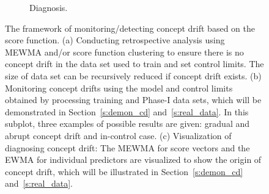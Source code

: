 \documentclass[twoside,11pt]{article}
\begin{document}
\begin{figure}[!htbp]
\begin{subfigure}[t]{0.49\linewidth}
         \caption{Diagnosis.}
         \label{fig:diagnosis}
  \end{subfigure}
  \caption{{The framework of monitoring/detecting concept drift based on the score function. (a) Conducting retrospective analysis using MEWMA and/or score function clustering to ensure there is no concept drift in the data set used to train and set control limits. The size of data set can be recursively reduced if concept drift exists. (b) Monitoring concept drifts using the model and control limits obtained by processing training and Phase-I data sets, which will be demonstrated in Section~\ref{s:demon_cd} and~\ref{s:real_data}. In this subplot, three examples of possible results are given: gradual and abrupt concept drift and in-control case. (c) Visualization of diagnosing concept drift: The MEWMA for score vectors and the EWMA for individual predictors are visualized to show the origin of concept drift, which will be illustrated in Section~\ref{s:demon_cd} and~\ref{s:real_data}.}}
  \label{fig:proc_mon_score}
\end{figure}



\end{document}

